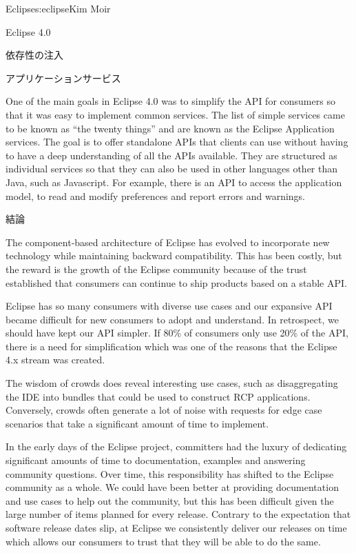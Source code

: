 \begin{aosachapter}{Eclipse}{s:eclipse}{Kim Moir}
\begin{aosasect1}{Eclipse 4.0}
\begin{aosasect2}{依存性の注入}
\end{aosasect2}

\begin{aosasect2}{アプリケーションサービス}

One of the main goals in Eclipse 4.0 was to simplify the API for
consumers so that it was easy to implement common services. The list
of simple services came to be known as ``the twenty things'' and are
known as the Eclipse Application services. The goal is to offer
standalone APIs that clients can use without having to have a deep
understanding of all the APIs available. They are structured as
individual services so that they can also be used in other languages
other than Java, such as Javascript.  For example, there is an API to
access the application model, to read and modify preferences and
report errors and warnings.

\end{aosasect2}

\end{aosasect1}

\begin{aosasect1}{結論}

The component-based architecture of Eclipse has evolved to incorporate
new technology while maintaining backward compatibility.  This has
been costly, but the reward is the growth of the Eclipse community
because of the trust established that consumers can continue to ship
products based on a stable API.

Eclipse has so many consumers with diverse use cases and our expansive
API became difficult for new consumers to adopt and understand. In
retrospect, we should have kept our API simpler. If 80\% of consumers
only use 20\% of the API, there is a need for simplification which was
one of the reasons that the Eclipse 4.x stream was created.

The wisdom of crowds does reveal interesting use cases, such as
disaggregating the IDE into bundles that could be used to construct
RCP applications.  Conversely, crowds often generate a lot of noise
with requests for edge case scenarios that take a significant amount
of time to implement.

In the early days of the Eclipse project, committers had the luxury of
dedicating significant amounts of time to documentation, examples and
answering community questions. Over time, this responsibility has
shifted to the Eclipse community as a whole.  We could have been
better at providing documentation and use cases to help out the
community, but this has been difficult given the large number of items
planned for every release.  Contrary to the expectation that software
release dates slip, at Eclipse we consistently deliver our releases on
time which allows our consumers to trust that they will be able to do
the same.


\end{aosasect1}
\end{aosachapter}
